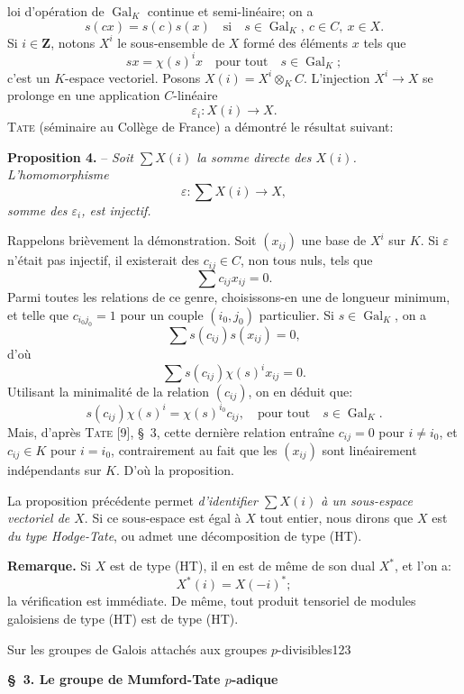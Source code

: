 loi d'opération de $\operatorname{Gal}_K$ continue et semi-linéaire; on a
\[
s(cx)=s(c)s(x)\quad\text{si}\quad s\in\operatorname{Gal}_K,\ c\in C,\ x\in X.
\]
Si $i\in\mathbf Z$, notons $X^i$ le sous-ensemble de $X$ formé des éléments $x$ tels que
\[
sx=\chi(s)^i x\quad\text{pour tout}\quad s\in\operatorname{Gal}_K;
\]
c'est un $K$-espace vectoriel. Posons $X(i)=X^i\otimes_K C$. L'injection $X^i\to X$ se prolonge en une application $C$-linéaire
\[
\varepsilon_i:X(i)\to X.
\]
\textsc{Tate} (séminaire au Collège de France) a démontré le résultat suivant:

\textbf{Proposition 4.} -- \textit{Soit $\sum X(i)$ la somme directe des $X(i)$. L'homomorphisme}
\[
\varepsilon:\sum X(i)\to X,
\]
\textit{somme des $\varepsilon_i$, est injectif.}

Rappelons brièvement la démonstration. Soit $(x_{ij})$ une base de $X^i$ sur $K$. Si $\varepsilon$ n'était pas injectif, il existerait des $c_{ij}\in C$, non tous nuls, tels que
\[
\sum c_{ij}x_{ij}=0.
\]
Parmi toutes les relations de ce genre, choisissons-en une de longueur minimum, et telle que $c_{i_0j_0}=1$ pour un couple $(i_0,j_0)$ particulier. Si $s\in\operatorname{Gal}_K$, on a
\[
\sum s(c_{ij})s(x_{ij})=0,
\]
d'où
\[
\sum s(c_{ij})\chi(s)^i x_{ij}=0.
\]
Utilisant la minimalité de la relation $(c_{ij})$, on en déduit que:
\[
s(c_{ij})\chi(s)^i=\chi(s)^{i_0}c_{ij},\quad\text{pour tout}\quad s\in\operatorname{Gal}_K.
\]
Mais, d'après \textsc{Tate} [9], \S\ 3, cette dernière relation entraîne $c_{ij}=0$ pour $i\neq i_0$, et $c_{ij}\in K$ pour $i=i_0$, contrairement au fait que les $(x_{ij})$ sont linéairement indépendants sur $K$. D'où la proposition.

La proposition précédente permet \textit{d'identifier $\sum X(i)$ à un sous-espace vectoriel de $X$}. Si ce sous-espace est égal à $X$ tout entier, nous dirons que $X$ est \textit{du type Hodge-Tate}, ou admet une décomposition de type (HT).

\textbf{Remarque.} Si $X$ est de type (HT), il en est de même de son dual $X^*$, et l'on a:
\[
X^*(i)=X(-i)^*;
\]
la vérification est immédiate. De même, tout produit tensoriel de modules galoisiens de type (HT) est de type (HT).

\begin{center}Sur les groupes de Galois attachés aux groupes $p$-divisibles\hfill123\end{center}

\begin{center}\textbf{\S\ 3. Le groupe de Mumford-Tate $p$-adique}\end{center}

